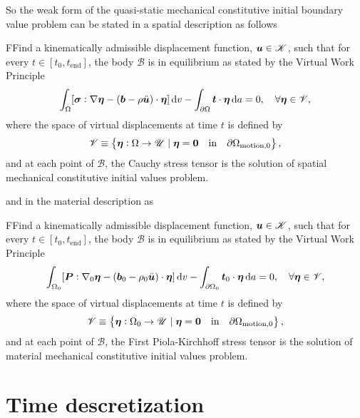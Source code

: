 So the weak form of the quasi-static mechanical constitutive initial boundary value problem can be stated in a spatial description as follows
\begin{problem}
    FFind a kinematically admissible displacement function, $\bm{u}\in \mathscr{K}$, such that for every $t\in [t_0,t_\text{end}]$, the body $\mathscr{B}$ is in equilibrium as stated by the Virtual Work Principle
        \begin{equation}
        \int_\Omega [\bm{\sigma}:\nabla \bm{\eta} - (\bm{b}-\rho\ddot{\bm u})\cdot \bm{\eta}]\,\mathrm{d} v - \int_{\partial\Omega} \bm{t}\cdot \bm{\eta}\,\mathrm{d} a = 0,\quad \forall \bm{\eta} \in \mathscr{V},
    \end{equation}
    where the space of virtual displacements at time $t$ is defined by
    \begin{equation}
        \mathscr{V} \equiv \left\{\bm{\eta}:\Omega\to \mathscr{U}\;|\;\bm{\eta} = \bm{0}\quad \text{in}\quad \partial\Omega_\text{motion,0}\right\},
    \end{equation}
    and at each point of $\mathscr{B}$, the Cauchy stress tensor is the solution of spatial mechanical constitutive initial values problem.
\end{problem}
and in the material description as
\begin{problem}
    FFind a kinematically admissible displacement function, $\bm{u}\in \mathscr{K}$, such that for every $t\in [t_0,t_\text{end}]$, the body $\mathscr{B}$ is in equilibrium as stated by the Virtual Work Principle
        \begin{equation}
        \int_{\Omega_0} [\bm{P}:\nabla_0 \bm{\eta} - (\bm{b}_0-\rho_0\ddot{\bm u})\cdot \bm{\eta}]\,\mathrm{d} v - \int_{\partial\Omega_0} \bm{t}_0\cdot \bm{\eta}\,\mathrm{d} a = 0,\quad \forall \bm{\eta} \in \mathscr{V},
    \end{equation}
    where the space of virtual displacements at time $t$ is defined by
    \begin{equation}
        \mathscr{V} \equiv \left\{\bm{\eta}:\Omega_0\to \mathscr{U}\;|\;\bm{\eta} = \bm{0}\quad \text{in}\quad \partial\Omega_\text{motion,0}\right\},
    \end{equation}
    and at each point of $\mathscr{B}$, the First Piola-Kirchhoff stress tensor is the solution of material mechanical constitutive initial values problem.
\end{problem}

\section{Time descretization} \label{sec:time_discretization}

